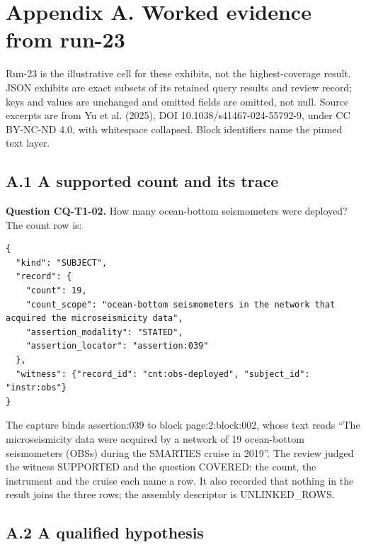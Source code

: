 \clearpage
\section*{Appendix A. Worked evidence from run-23}

Run-23 is the illustrative cell for these exhibits, not the highest-coverage result. JSON exhibits are exact subsets of its retained query results and review record; keys and values are unchanged and omitted fields are omitted, not null. Source excerpts are from Yu et al. (2025), DOI 10.1038/s41467-024-55792-9, under CC BY-NC-ND 4.0, with whitespace collapsed. Block identifiers name the pinned text layer.

\subsection*{A.1 A supported count and its trace}

\par\medskip
\noindent\begin{minipage}{\linewidth}
\textbf{Question CQ-T1-02.} How many ocean-bottom seismometers were deployed? The count row is:

\begin{lstlisting}
{
  "kind": "SUBJECT",
  "record": {
    "count": 19,
    "count_scope": "ocean-bottom seismometers in the network that acquired the microseismicity data",
    "assertion_modality": "STATED",
    "assertion_locator": "assertion:039"
  },
  "witness": {"record_id": "cnt:obs-deployed", "subject_id": "instr:obs"}
}
\end{lstlisting}
\end{minipage}\par\medskip

The capture binds assertion:039 to block page:2:block:002, whose text reads “The microseismicity data were acquired by a network of 19 ocean-bottom seismometers (OBSs) during the SMARTIES cruise in 2019”. The review judged the witness SUPPORTED and the question COVERED: the count, the instrument and the cruise each name a row. It also recorded that nothing in the result joins the three rows; the assembly descriptor is UNLINKED\_\allowbreak{}ROWS.

\subsection*{A.2 A qualified hypothesis}

